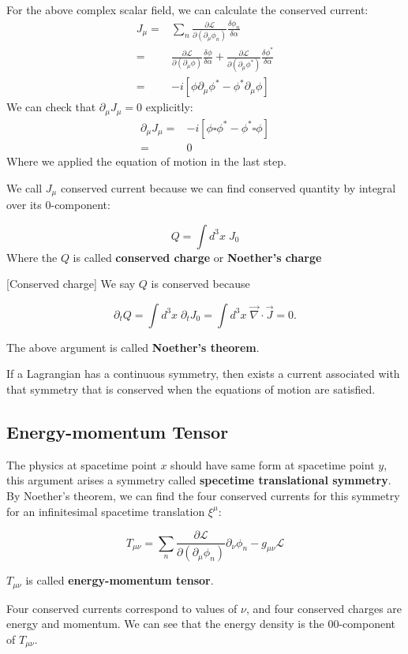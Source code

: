 \documentclass[12pt]{article}
\numberwithin{equation}{subsection}
\theoremstyle{mystyle}{\newtheorem{definition}{Definition}[subsection]}
\theoremstyle{mystyle}{\newtheorem{theorem}[definition]{Theorem}}
\theoremstyle{mystyle}{\newtheorem*{remark}{Remark}}
\theoremstyle{mystyle}{\newtheorem{example}{Example}[subsection]}
\theoremstyle{mystyle}{\newtheorem{examples}{Examples}[subsection]}
\theoremstyle{mystyle}{\newtheorem{cthm}{}[subsection]}
\newcommand{\p}{\partial}
\begin{document}
\begin{example}
  For the above complex scalar field, we can calculate the conserved current:
  \bigskip
  \begin{align*}
    J_{\mu}= & \sum_n\frac{\p \mathcal{L}}{\p(\p_\mu \phi_n)}\frac{\delta\phi_n}{\delta \alpha} \\
    =        & \frac{\p \mathcal{L}}{\p(\p_\mu \phi)}\frac{\delta\phi}{\delta \alpha}
    +\frac{\p \mathcal{L}}{\p(\p_\mu \phi^*)}\frac{\delta\phi^*}{\delta \alpha}                 \\
    =        & -i\left[\phi\p_\mu\phi^*-\phi^* \p_\mu\phi\right]
  \end{align*}
  We can check that \(\p_\mu J_{\mu}=0\) explicitly:
  \begin{align*}
    \p_\mu J_{\mu}= & -i\left[\phi\square\phi^*-\phi^* \square\phi\right] \\
    =               & 0
  \end{align*}
  Where we applied the equation of motion in the last step.
\end{example}
We call \(J_\mu\) conserved current because we can find conserved quantity by integral over its 0-component:
\begin{definition}
  \[Q=\int d^3x\;J_0\]
  Where the \(Q\) is called \textbf{conserved charge} or \textbf{Noether's charge}
\end{definition}[Conserved charge]
We say \(Q\) is conserved because
\begin{cthm}
  \[\p_tQ=\int d^3x \; \p_t J_0 = \int d^3x\;\vec{\nabla}\cdot \vec{J} = 0.\]
\end{cthm}
The above argument is called \textbf{Noether's theorem}.
\begin{theorem}
  If a Lagrangian has a continuous symmetry,
  then exists a current associated with that symmetry that is
  conserved when the equations of motion are satisfied.
\end{theorem}

\subsection{Energy-momentum Tensor}
The physics at spacetime point \(x\) should have same form at spacetime point \(y\),
this argument arises a symmetry called \textbf{specetime translational symmetry}.
By Noether's theorem, we can find the four conserved currents for this symmetry for an infinitesimal
spacetime translation \(\xi^\mu\):
\begin{cthm}
  \[T_{\mu\nu}=\sum_n \frac{\p \mathcal{L}}{\p(\p_{\mu}\phi_n)}\p_\nu\phi_n-g_{\mu\nu}\mathcal{L}\]

  \(T_{\mu\nu}\) is called \textbf{energy-momentum tensor}.
\end{cthm}
Four conserved currents correspond to values of \(\nu\), and four conserved charges are energy and momentum.
We can see that the energy density is the 00-component of \(T_{\mu\nu}\).



\newpage
\end{document}
